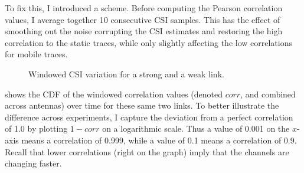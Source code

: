 To fix this, I introduced a  scheme. Before computing the Pearson correlation values, I average together 10 consecutive CSI samples. This has the effect of smoothing out the noise corrupting the CSI estimates and restoring the high correlation to the static traces, while only slightly affecting the low correlations for mobile traces.

\begin{figure}[tp]
	\centering
	\hspace{0.03\textwidth}%
	\caption{\label{fig:mobility_csi_cdf}Windowed CSI variation for a strong and a weak link.}
\end{figure}

 shows the CDF of the windowed correlation values (denoted $\mathit{corr}$, and combined across antennas) over time for these same two links. To better illustrate the difference across experiments, I capture the deviation from a perfect correlation of 1.0 by plotting $1-\mathit{corr}$ on a logarithmic scale. Thus a value of 0.001 on the $x$-axis means a correlation of 0.999, while a value of 0.1 means a correlation of 0.9. Recall that lower correlations (right on the graph) imply that the channels are changing faster.

